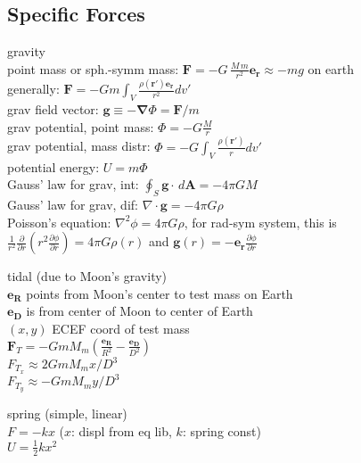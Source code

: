 \documentclass[letterpaper,landscape,10pt]{article}
\newenvironment{mydescription}
{\begin{description}
	\setlength{\itemsep}{0pt}
	\setlength{\parskip}{0pt}
	\setlength{\parsep}{-1pt}}
{\end{description}}
\begin{document}
{\begin{multicols}{3}
	\subsection*{Specific Forces}
		\begin{mydescription}
			\item[gravity] \  \\
				point mass or sph.-symm mass:
				$\bm{F} = -G \, {\frac{ M \, m}{r^2}}\bm{e_r} \approx -mg$
				on earth \\
				generally:
				$\bm{F} = -Gm \int_V \frac{\rho(\bm{r}')\bm{e_r}}{r^2}dv'$ \\
				grav field vector: $\bm{g} \equiv - \bm{\nabla} \Phi
					= \bm{F}/m$ \\
				grav potential, point mass: $\Phi = -G\frac{M}{r}$\\
				grav potential, mass distr: $\Phi = -G\int_V
					\frac{\rho(\bm{r}')}{r}dv'$\\
				potential energy: $U = m \Phi$\\
				Gauss' law for grav, int: $\oint_S \bm{g}\cdot \, d\bm{A} = -4\pi GM$\\
				Gauss' law for grav, dif: $\nabla \cdot \bm{g}=-4\pi G\rho$\\
				Poisson's equation: $\nabla^2\phi = 4\pi G\rho$, for rad-sym
				system, this is $\frac{1}{r^2}\frac{\partial}{\partial
				r}\left(r^2\frac{\partial\phi}{\partial r}\right) = 4\pi G
				\rho(r)$ and $\bm{g}(r)=-\bm{e_r}
				\frac{\partial\phi}{\partial r}$

			\vspace{4pt}

			\item[tidal] (due to Moon's gravity) \\
				$\bm{e_R}$ points from Moon's center to test mass on Earth \\
				$\bm{e_D}$ is from center of Moon to center of Earth \\
				$(x,y)$ ECEF coord of test mass\\
				$\bm{F}_T=-GmM_m \left( \frac{\bm{e_R}}{R^2} -
				\frac{\bm{e_D}}{D^2}\right)$\\
				$F_{T_x} \approx 2GmM_mx/D^3$\\
				$F_{T_y} \approx -GmM_my/D^3$

		\item[spring] (simple, linear) \\
			$F = -kx$ ($x$: displ from eq lib, $k$: spring const)  \\
			$U = \frac{1}{2}kx^2$\\


\end{mydescription}
\end{multicols}}
\end{document}
